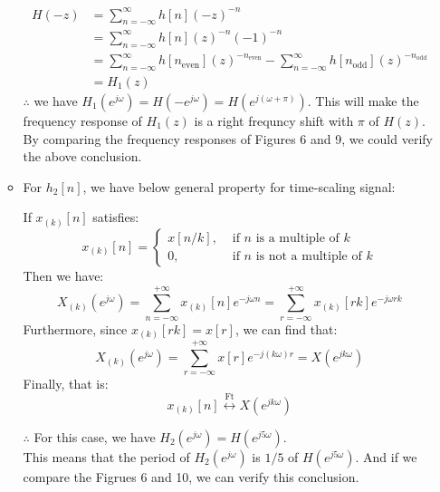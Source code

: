 \documentclass[onecolumn,oneside]{SUSTechHomework}
\begin{document}
\begin{itemize}
\begin{itemize}
$$\begin{aligned}
            H(-z)&=\sum_{n=-\infty}^{\infty} h[n](-z)^{-n}\\
            &=\sum_{n=-\infty}^{\infty} h[n](z)^{-n}(-1)^{-n}\\
            &=\sum_{n=-\infty}^{\infty} h\left[n_{\text {even}}\right](z)^{-n_{\text {even}}}-\sum_{n=-\infty}^{\infty} h\left[n_{\text {odd}}\right](z)^{-n_{\text{odd}}}
            \\ & =H_{1}(z)    
        \end{aligned}
        $$
        $\therefore$ we have $H_1(e^{j\omega})=H(-e^{j\omega})=H(e^{j(\omega+\pi)})$. This will make the frequency response of $H_1(z)$ is a right frequncy shift with $\pi$ of $H(z)$.
        \\ By comparing the frequency responses of Figures 6 and 9, we could verify the above conclusion.
        \item For $h_2[n]$, we have below general property for time-scaling signal:
        \begin{info}
        If $x_{(k)}[n]$ satisfies:
        $$
        x_{(k)}[n]=\left\{\begin{array}{ll}x[n / k], & \text { if } n \text { is a multiple of } k \\0, & \text { if } n \text { is not a multiple of } k\end{array}\right.
        $$
        Then we have:
        $$
        X_{(k)}\left(e^{j \omega}\right)=\sum_{n=-\infty}^{+\infty} x_{(k)}[n] e^{-j \omega n}=\sum_{r=-\infty}^{+\infty} x_{(k)}[r k] e^{-j \omega r k}
        $$
        Furthermore, since $x_{(k)}[r k]=x[r]$, we can find that:
        $$
        X_{(k)}\left(e^{j \omega}\right)=\sum_{r=-\infty}^{+\infty} x[r] e^{-j(k \omega) r}=X\left(e^{j k \omega}\right)
        $$
        Finally, that is:
        $$
        x_{(k)}[n] \stackrel{\mathrm{Ft}}{\longleftrightarrow} X\left(e^{j k \omega}\right)
        $$
        \end{info}
        $\therefore$ For this case, we have $H_2(e^{j\omega})=H(e^{j5\omega})$.\\
        This means that the period of $H_2(e^{j\omega})$ is $1/5$ of $H(e^{j5\omega})$. And if we
        compare the Figrues 6 and 10, we can verify this conclusion.
    \end{itemize}
\end{itemize}
\end{document}
